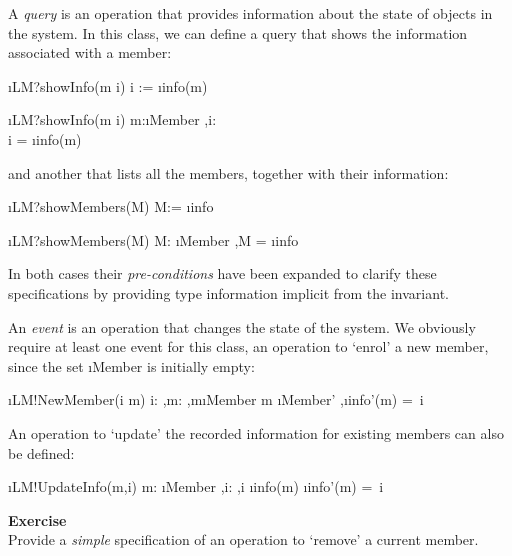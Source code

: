 \documentclass[12pt,a4paper]{article}
\newcounter{exer} %
\newcommand{\exer} %
	{\stepcounter{exer}{\;\arabic{exer}}}
\begin{document}
\medskip\noindent A \emph{query} is an operation that provides information about the state of objects in the system.
In this class, we can define a query that shows the information associated with a member:
\begin{showspecs}
	\begin{spec}{\i{LM?showInfo(m \to i)}}
		i := \i{info}(m)
	\end{spec}
\showbeside
	\begin{spec}[\equiv]{\i{LM?showInfo(m \to i)}}
		m:\i{Member} \sep i: \\ i = \i{info}(m)
	\end{spec}
\end{showspecs}
\noindent and another that lists all the members, together with their information:
\begin{showspecs}
	\begin{spec}{\i{LM?showMembers(\to M)}}
		M:= \i{info}
	\end{spec}
\showbeside
	\begin{spec}[\equiv]{\i{LM?showMembers(\to M)}}
		M: \i{Member} \tfun {} \sep M = \i{info}
	\end{spec}
\end{showspecs}
\noindent In both cases their \emph{pre-conditions} have been expanded
to clarify these specifications by providing type information implicit from the invariant.

\medskip\noindent An \emph{event} is an operation that changes the state of the system. We obviously require at least one event
for this class, an operation to `enrol' a new member, since the set \i{Member} is initially empty:
\begin{showspecs}
	\begin{spec}{\i{LM!NewMember(i \to m)}}
		i:  \sep m:  \sep m\notin\i{Member}
	\post	m \in \i{Member'} \sep \i{info'}(m) =\, i
	\end{spec}
\end{showspecs}

\smallskip\noindent An operation to `update' the recorded
information for existing members can also be defined:
\begin{showspecs}
	\begin{spec}{\i{LM!UpdateInfo(m,i)}}
		m: \i{Member} \sep i:  \sep i \neq \i{info}(m)
	\post	\i{info'}(m) =\, i
	\end{spec}
\end{showspecs}
\smallskip\noindent \textbf{Exercise}\exer\\
Provide a \emph{simple}
specification of an operation to `remove' a current member.
\end{document}
